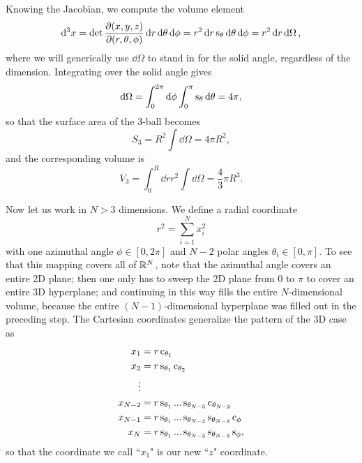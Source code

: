 Knowing the Jacobian, we compute the volume element
\begin{equation}
  \dd[3]{x}=\det\frac{\partial(x,y,z)}{\partial(r,\theta,\phi)}
             \dd{r}\dd{\theta}\dd{\phi}
      =r^2\dd{r}\operatorname{s}_\theta\dd{\theta}\dd{\phi}=r^2\dd{r}\dd{\Omega},
\end{equation}
where we will generically use $\dd\Omega$ to stand in for the solid angle,
regardless of the dimension. Integrating over the solid angle gives
\begin{equation}
  \dd{\Omega}=\int_0^{2\pi}\dd{\phi}\int_0^{\pi}\operatorname{s}_\theta\dd{\theta}=4\pi,
\end{equation}
so that the surface area of the 3-ball becomes
\begin{equation}\label{eq:3ds}
  S_3=R^2\int\dd{\Omega}=4\pi R^2,
\end{equation}
and the corresponding volume is
\begin{equation}\label{eq:3dv}
  V_3=\int_0^R\dd{r}r^2\int\dd{\Omega}=\frac{4}{3}\pi R^3.
\end{equation}

Now let us work in $N>3$ dimensions. We define a radial coordinate
\begin{equation}
  r^2=\sum_{i=1}^N x_i^2
\end{equation}
with one azimuthal angle $\phi\in[0,2\pi]$ and $N-2$ polar angles 
$\theta_i\in[0,\pi]$. To see that this mapping covers all of $\mathbb{R}^N$,
note that the azimuthal angle covers an entire 2D plane; then one
only has to sweep the 2D plane from 0 to $\pi$ to cover an entire
3D hyperplane; and continuing in this way fills the entire $N$-dimensional 
volume, because the entire $(N-1)$-dimensional hyperplane was filled out in 
the preceding step. The Cartesian coordinates generalize the pattern
of the 3D case as 
\begin{equation}\label{eq:cartesianN}
  \begin{aligned}
        x_1&=r\operatorname{c}_{\theta_1}\\
        x_2&=r\operatorname{s}_{\theta_1}\operatorname{c}_{\theta_2}\\
     \vdots&\\
    x_{N-2}&=r\operatorname{s}_{\theta_1}...\operatorname{s}_{\theta_{N-3}}\operatorname{c}_{\theta_{N-2}}\\
    x_{N-1}&=r\operatorname{s}_{\theta_1}...\operatorname{s}_{\theta_{N-3}}\operatorname{s}_{\theta_{N-2}}\operatorname{c}_\phi\\
        x_N&=r\operatorname{s}_{\theta_1}...\operatorname{s}_{\theta_{N-3}}\operatorname{s}_{\theta_{N-2}}\operatorname{s}_\phi,
  \end{aligned}
\end{equation}
so that the coordinate we call ``$x_1$" is our new ``$z$" coordinate.

